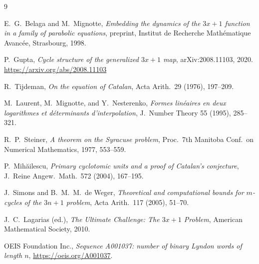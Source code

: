 \documentclass[11pt]{amsart}
\theoremstyle{plain}
\theoremstyle{definition}
\begin{document}
\begin{thebibliography}{9}

E.~G.~Belaga and M.~Mignotte,
\emph{Embedding the dynamics of the $3x+1$ function in a family of
parabolic equations},
preprint, Institut de Recherche Mathématique Avancée, Strasbourg,
1998.

P.~Gupta,
\emph{Cycle structure of the generalized $3x+1$ map},
arXiv:2008.11103, 2020.
\url{https://arxiv.org/abs/2008.11103}

R.~Tijdeman,
\emph{On the equation of Catalan},
Acta Arith.~29 (1976), 197--209.

M.~Laurent, M.~Mignotte, and Y.~Nesterenko,
\emph{Formes lin\'eaires en deux logarithmes et d\'eterminants
d'interpolation},
J.~Number Theory 55 (1995), 285--321.

R.~P.~Steiner,
\emph{A theorem on the Syracuse problem},
Proc.~7th Manitoba Conf.~on Numerical Mathematics, 1977, 553--559.

P.~Mih\u{a}ilescu,
\emph{Primary cyclotomic units and a proof of Catalan's conjecture},
J.~Reine Angew.~Math.~572 (2004), 167--195.

J.~Simons and B.~M.~M.~de Weger,
\emph{Theoretical and computational bounds for $m$-cycles of the
$3n+1$ problem},
Acta Arith.~117 (2005), 51--70.

J.~C.~Lagarias (ed.),
\emph{The Ultimate Challenge: The $3x+1$ Problem},
American Mathematical Society, 2010.

OEIS Foundation Inc.,
\emph{Sequence A001037: number of binary Lyndon words of length $n$},
\url{https://oeis.org/A001037}.

\end{thebibliography}
\end{document}
